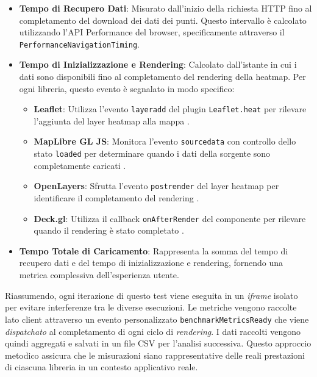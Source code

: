 \begin{itemize}
    \item \textbf{Tempo di Recupero Dati}: Misurato dall'inizio della richiesta HTTP fino al completamento del download dei dati dei punti. Questo intervallo è calcolato utilizzando l'API Performance del browser, specificamente attraverso il \texttt{PerformanceNavigationTiming}.

    \item \textbf{Tempo di Inizializzazione e Rendering}: Calcolato dall'istante in cui i dati sono disponibili fino al completamento del rendering della heatmap. Per ogni libreria, questo evento è segnalato in modo specifico:
    \begin{itemize}
        \item \textbf{Leaflet}: Utilizza l'evento \texttt{layeradd} del plugin \texttt{Leaflet.heat} per rilevare l'aggiunta del layer heatmap alla mappa \cite{leaflet-heat}.
        \item \textbf{MapLibre GL JS}: Monitora l'evento \texttt{sourcedata} con controllo dello stato \texttt{loaded} per determinare quando i dati della sorgente sono completamente caricati \cite{maplibre-sourcedata}.
        \item \textbf{OpenLayers}: Sfrutta l'evento \texttt{postrender} del layer heatmap per identificare il completamento del rendering \cite{openlayers-heatmap}.
        \item \textbf{Deck.gl}: Utilizza il callback \texttt{onAfterRender} del componente per rilevare quando il rendering è stato completato \cite{deckgl-onafterrender}.
    \end{itemize}

    \item \textbf{Tempo Totale di Caricamento}: Rappresenta la somma del tempo di recupero dati e del tempo di inizializzazione e rendering, fornendo una metrica complessiva dell'esperienza utente.
\end{itemize}

Riassumendo, ogni iterazione di questo test viene eseguita in un \textit{iframe} isolato per evitare interferenze tra le diverse esecuzioni. Le metriche vengono raccolte lato client attraverso un evento personalizzato \texttt{benchmarkMetricsReady} che viene \textit{dispatchato} al completamento di ogni ciclo di \textit{rendering}. I dati raccolti vengono quindi aggregati e salvati in un file CSV per l'analisi successiva. Questo approccio metodico assicura che le misurazioni siano rappresentative delle reali prestazioni di ciascuna libreria in un contesto applicativo reale.


